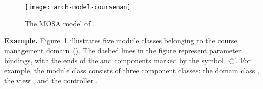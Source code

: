 
\begin{figure}[th]
	\centering

		\texttt{[image: arch-model-courseman]}
		\caption{The MOSA model of \courseman.}
	\vspace{-0.4cm}
		\label{fig:arch-model-courseman}

\end{figure}

%
\noindent \textbf{Example.} %
Figure~\ref{fig:arch-model-courseman} illustrates five module classes belonging to the course management domain~(\courseman). The dashed lines in the figure represent parameter bindings, with the ends of the  and  components marked by the symbol~`$\bigcirc$'. For example, the module class  consists of three component classes: the domain class , the view , and the controller .

